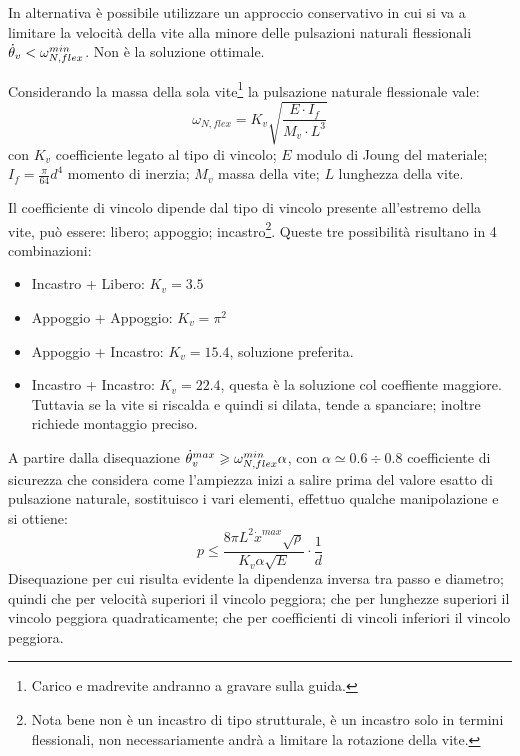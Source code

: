 In alternativa è possibile utilizzare un approccio conservativo in cui si va a limitare la velocità della vite alla minore delle pulsazioni naturali flessionali \( \dot{\theta}_v < \omega_{N,flex}^{min} \). Non è la soluzione ottimale.

Considerando la massa della sola vite\footnote{Carico e madrevite andranno a gravare sulla guida.} la pulsazione naturale flessionale vale:
\[ \omega_{N,flex} = K_v \sqrt{\frac{E \cdot I_f}{M_v \cdot L^3}} \]
con \( K_v \) coefficiente legato al tipo di vincolo; \( E \) modulo di Joung del materiale; \( I_f = \frac{\pi}{64}d^4 \) momento di inerzia; \( M_v \) massa della vite; \( L \) lunghezza della vite.

Il coefficiente di vincolo dipende dal tipo di vincolo presente all'estremo della vite, può essere: libero; appoggio; incastro\footnote{Nota bene non è un incastro di tipo strutturale, è un incastro solo in termini flessionali, non necessariamente andrà a limitare la rotazione della vite.}.
Queste tre possibilità risultano in 4 combinazioni:
\begin{itemize}
    \item Incastro + Libero: \(K_v = 3.5\)
    \item Appoggio + Appoggio: \(K_v = \pi^2\)
    \item Appoggio + Incastro: \(K_v = 15.4\), soluzione preferita.
    \item Incastro + Incastro: \(K_v = 22.4\), questa è la soluzione col coeffiente maggiore. Tuttavia se la vite si riscalda e quindi si dilata, tende a spanciare; inoltre richiede montaggio preciso.
\end{itemize}

A partire dalla disequazione \( \dot{\theta}_v^{max} \geqslant \omega_{N,flex}^{min} \alpha \), con \( \alpha \simeq 0.6\div 0.8 \) coefficiente di sicurezza che considera come l'ampiezza inizi a salire prima del valore esatto di pulsazione naturale, sostituisco i vari elementi, effettuo qualche manipolazione e si ottiene:
\[ p \leqslant \frac{8\pi L^2 \dot{x}^{max} \sqrt{\rho}}{K_v \alpha \sqrt{E}} \cdot \frac{1}{d} \]
Disequazione per cui risulta evidente la dipendenza inversa tra passo e diametro; quindi che per velocità superiori il vincolo peggiora; che per lunghezze superiori il vincolo peggiora quadraticamente; che per coefficienti di vincoli inferiori il vincolo peggiora.

